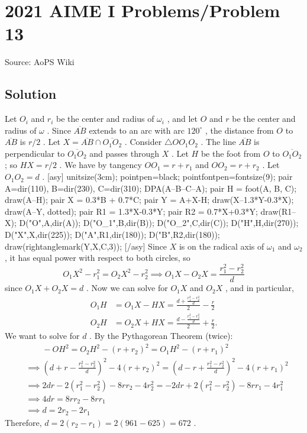 \documentclass[12pt]{article}
\begin{document}
\section*{{2021 AIME I Problems/Problem 13}}
Source: AoPS Wiki

\subsection*{Solution}
Let $O_i$ and $r_i$ be the center and radius of $\omega_i$ , and let $O$ and $r$ be the center and radius of $\omega$ . Since $\overline{AB}$ extends to an arc with arc $120^\circ$ , the distance from $O$ to $\overline{AB}$ is $r/2$ . Let $X=\overline{AB}\cap \overline{O_1O_2}$ . Consider $\triangle OO_1O_2$ . The line $\overline{AB}$ is perpendicular to $\overline{O_1O_2}$ and passes through $X$ . Let $H$ be the foot from $O$ to $\overline{O_1O_2}$ ; so $HX=r/2$ . We have by tangency $OO_1=r+r_1$ and $OO_2=r+r_2$ . Let $O_1O_2=d$ . [asy] unitsize(3cm); pointpen=black; pointfontpen=fontsize(9); pair A=dir(110), B=dir(230), C=dir(310); DPA(A--B--C--A); pair H = foot(A, B, C); draw(A--H); pair X = 0.3*B + 0.7*C; pair Y = A+X-H; draw(X--1.3*Y-0.3*X); draw(A--Y, dotted); pair R1 = 1.3*X-0.3*Y; pair R2 = 0.7*X+0.3*Y; draw(R1--X); D("O",A,dir(A)); D("O_1",B,dir(B)); D("O_2",C,dir(C)); D("H",H,dir(270)); D("X",X,dir(225)); D("A",R1,dir(180)); D("B",R2,dir(180)); draw(rightanglemark(Y,X,C,3)); [/asy] Since $X$ is on the radical axis of $\omega_1$ and $\omega_2$ , it has equal power with respect to both circles, so \[O_1X^2 - r_1^2 = O_2X^2-r_2^2 \implies O_1X-O_2X = \frac{r_1^2-r_2^2}{d}\] since $O_1X+O_2X=d$ . Now we can solve for $O_1X$ and $O_2X$ , and in particular, \begin{align*} O_1H &= O_1X - HX = \frac{d+\frac{r_1^2-r_2^2}{d}}{2} - \frac{r}{2} \\ O_2H &= O_2X + HX = \frac{d-\frac{r_1^2-r_2^2}{d}}{2} + \frac{r}{2}. \end{align*} We want to solve for $d$ . By the Pythagorean Theorem (twice): \begin{align*} &\qquad -OH^2 = O_2H^2 - (r+r_2)^2 = O_1H^2 - (r+r_1)^2 \\ &\implies \left(d+r-\tfrac{r_1^2-r_2^2}{d}\right)^2 - 4(r+r_2)^2 = \left(d-r+\tfrac{r_1^2-r_2^2}{d}\right)^2 - 4(r+r_1)^2 \\ &\implies 2dr - 2(r_1^2-r_2^2)-8rr_2-4r_2^2 = -2dr+2(r_1^2-r_2^2)-8rr_1-4r_1^2 \\ &\implies 4dr = 8rr_2-8rr_1 \\ &\implies d=2r_2-2r_1 \end{align*} Therefore, $d=2(r_2-r_1) = 2(961-625)=\boxed{672}$ .
\end{document}
